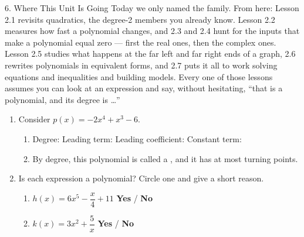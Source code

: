\documentclass[10pt]{article}
\begin{document}
\vspace{0.1in}

\boxguard
\begin{notesbox}{6. Where This Unit Is Going}
Today we only named the family. From here: Lesson 2.1 revisits quadratics, the
degree-2 members you already know. Lesson 2.2 measures how fast a polynomial
changes, and 2.3 and 2.4 hunt for the inputs that make a polynomial equal zero
--- first the real ones, then the complex ones. Lesson 2.5 studies what happens at
the far left and far right ends of a graph, 2.6 rewrites polynomials in equivalent
forms, and 2.7 puts it all to work solving equations and inequalities and building
models. Every one of those lessons assumes you can look at an expression and say,
without hesitating, ``that is a polynomial, and its degree is \ldots''
\end{notesbox}

\vspace{0.1in}

\boxguard
\begin{practicebox}
\begin{enumerate}[itemsep=8pt]
  \item Consider $p(x) = -2x^4 + x^3 - 6$.

        \begin{enumerate}[label=(\alph*), itemsep=4pt]
          \item Degree: \blank{1.6cm} \quad Leading term: \blank{2.2cm} \quad
                Leading coefficient: \blank{1.6cm} \quad
                Constant term: \blank{1.6cm}
          \item By degree, this polynomial is called a \blank{2.6cm}, and it has
                at most \blank{1.4cm} turning points.
        \end{enumerate}

  \item Is each expression a polynomial? Circle one and give a short reason.

        \begin{enumerate}[label=(\alph*), itemsep=6pt]
          \item $h(x) = 6x^5 - \dfrac{x}{4} + 11$ \quad \textbf{Yes} / \textbf{No}

                \vspace{0.05in}
                \writeline

          \item $k(x) = 3x^2 + \dfrac{5}{x}$ \quad \textbf{Yes} / \textbf{No}

                \vspace{0.05in}
                \writeline
        \end{enumerate}
\end{enumerate}
\end{practicebox}
\end{document}
